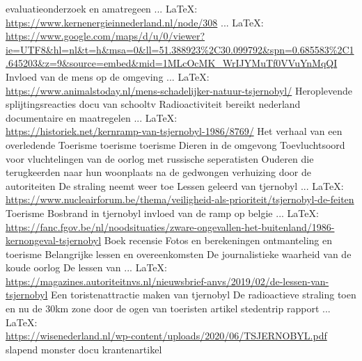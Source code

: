 \begin{thebibliography}{99}
{{{{{{{							evaluatieonderzoek en amatregeen
							 ... \LaTeX:\\ \url{https://www.kernenergieinnederland.nl/node/308}
							 ... \LaTeX:\\ \url{https://www.google.com/maps/d/u/0/viewer?ie=UTF8&hl=nl&t=h&msa=0&ll=51.388923%2C30.099792&spn=0.685583%2C1.645203&z=9&source=embed&mid=1MLcOcMK_WrIJYMuTf0VVuYnMqQI}
							Invloed van de mens op de omgeving
							 ... \LaTeX:\\ \url{https://www.animalstoday.nl/mens-schadelijker-natuur-tsjernobyl/}
							Heroplevende splijtingsreacties
							docu van schooltv
							Radioactiviteit bereikt nederland
							documentaire en maatregelen
							 ... \LaTeX:\\ \url{https://historiek.net/kernramp-van-tsjernobyl-1986/8769/}
							Het verhaal van een overledende
							Toerisme
							toerisme
							toerisme
							Dieren in de omgevong
							Toevluchtsoord voor vluchtelingen van de oorlog met russische seperatisten
							Ouderen die terugkeerden naar hun woonplaats na de gedwongen verhuizing door de autoriteiten
							De straling neemt weer toe
							Lessen geleerd van tjernobyl
							 ... \LaTeX:\\ \url{https://www.nucleairforum.be/thema/veiligheid-als-prioriteit/tsjernobyl-de-feiten}
							Toerisme
							Bosbrand in tjernobyl
							invloed van de ramp op belgie
							 ... \LaTeX:\\ \url{https://fanc.fgov.be/nl/noodsituaties/zware-ongevallen-het-buitenland/1986-kernongeval-tsjernobyl}
							Boek recensie
							Fotos en berekeningen
							ontmanteling en toerisme
							Belangrijke lessen en overeenkomsten
							De journalistieke waarheid van de koude oorlog
							De lessen van
							 ... \LaTeX:\\ \url{https://magazines.autoriteitnvs.nl/nieuwsbrief-anvs/2019/02/de-lessen-van-tsjernobyl}
							Een toristenattractie maken van tjernobyl
							De radioactieve straling toen en nu
							de 30km zone door de ogen van toeristen
							artikel
							stedentrip
							rapport
							 ... \LaTeX:\\ \url{https://wisenederland.nl/wp-content/uploads/2020/06/TSJERNOBYL.pdf}
							slapend monster
							docu
							krantenartikel
}}}}}}}
\end{thebibliography}
